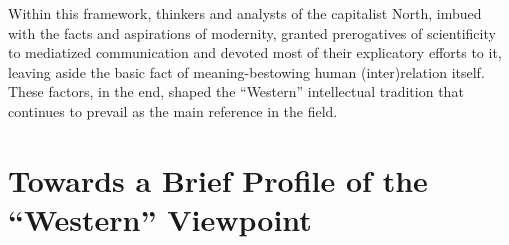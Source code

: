 \documentclass{tufte-handout}
\begin{document}
Within this framework, thinkers and analysts of the capitalist North,
imbued with the facts and aspirations of modernity, granted prerogatives
of scientificity to mediatized communication and devoted most of their
explicatory efforts to it, leaving aside the basic fact of
meaning-bestowing human (inter)relation itself. These factors, in the
end, shaped the ``Western'' intellectual tradition that continues to
prevail as the main reference in the field.

\hypertarget{towards-a-brief-profile-of-the-western-viewpoint}{%
\section{Towards a Brief Profile of the ``Western''
Viewpoint}\label{towards-a-brief-profile-of-the-western-viewpoint}}
\end{document}
